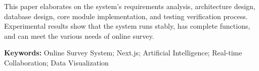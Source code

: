 This paper elaborates on the system's requirements analysis, architecture design, database design, core module implementation, and testing verification process. Experimental results show that the system runs stably, has complete functions, and can meet the various needs of online survey.

\vspace{1em}
\noindent\textbf{Keywords:} Online Survey System; Next.js; Artificial Intelligence; Real-time Collaboration; Data Visualization

\newpage
